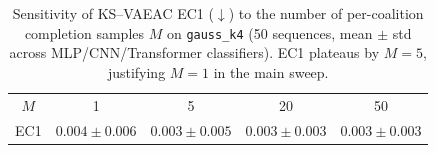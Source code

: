 \begin{table}[t]
\centering\small
\caption{Sensitivity of KS--VAEAC EC1 ($\downarrow$) to the number of per-coalition completion samples $M$ on \texttt{gauss\_k4} (50 sequences, mean $\pm$ std across MLP/CNN/Transformer classifiers).  EC1 plateaus by $M{=}5$, justifying $M{=}1$ in the main sweep.}
\label{tab:m_ablation}
\begin{tabular}{ccccc}
\toprule
$M$ & 1 & 5 & 20 & 50 \\
EC1 & $0.004\!\pm\!0.006$ & $0.003\!\pm\!0.005$ & $0.003\!\pm\!0.003$ & $0.003\!\pm\!0.003$ \\
\bottomrule
\end{tabular}
\end{table}
